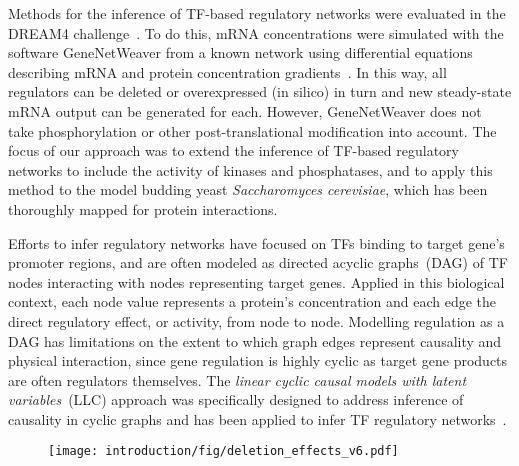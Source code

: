 \documentclass[10pt,letterpaper]{article}
\begin{document}
Methods for the inference of TF-based regulatory networks were evaluated in the DREAM4 challenge~. To do this, mRNA concentrations were simulated with the software GeneNetWeaver from a known network using differential equations describing mRNA and protein concentration gradients~. In this way, all regulators can be deleted or overexpressed (in silico) in turn and new steady-state mRNA output can be generated for each. 
However, GeneNetWeaver does not take phosphorylation or other post-translational modification into account.
The focus of our approach was to extend the inference of TF-based regulatory networks to include the activity of kinases and phosphatases, and to apply this method to the model budding yeast \textit{Saccharomyces cerevisiae}, which has been thoroughly mapped for protein interactions.

Efforts to infer regulatory networks have focused on TFs binding to target gene's promoter regions, and are often modeled as directed acyclic graphs~(DAG) of TF nodes interacting with nodes representing target genes.
Applied in this biological context, each node value represents a protein's concentration and each edge the direct regulatory effect, or activity, from node to node. 
Modelling regulation as a DAG has limitations on the extent to which graph edges represent causality and physical interaction, since gene regulation is highly cyclic as target gene products are often regulators themselves. 
The \textit{linear cyclic causal models with latent variables}~(LLC) approach was specifically designed to address inference of causality in cyclic graphs and has been applied to infer TF regulatory networks~.

\begin{figure}[H]
    \begin{center}
    \texttt{[image: introduction/fig/deletion\_effects\_v6.pdf]}
    \end{center}
    \label{fig:deletion_effect}
\end{figure}
\end{document}
